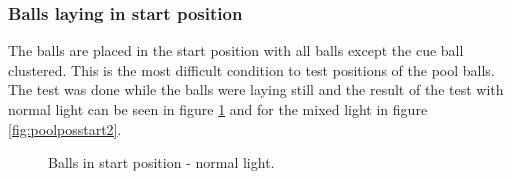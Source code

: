 \subsubsection{Balls laying in start position}
The balls are placed in the start position with all balls except the cue ball clustered. This is the most difficult condition to test positions of the pool balls. The test was done while the balls were laying still and the result of the test with normal light can be seen in figure \ref{fig:poolposstart} and for the mixed light in figure \ref{fig:poolposstart2}.

\begin{figure}[H]
  \centering
\quad
   \caption{Balls in start position - normal light.}
  \label{fig:poolposstart}
\end{figure}

